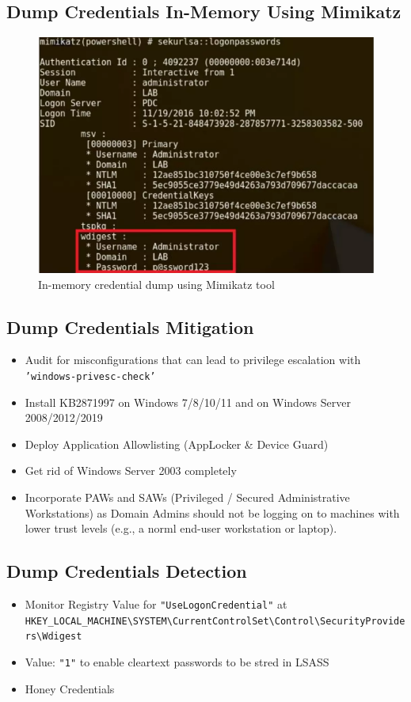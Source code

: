 \subsection{Dump Credentials In-Memory Using Mimikatz}
\begin{figure}
    \centering
    \includegraphics[width=0.75\linewidth]{mimikatz.png}
    \caption{In-memory credential dump using Mimikatz tool}
    \label{fig:placeholder}
\end{figure}
\subsection{Dump Credentials Mitigation}
\begin{itemize}
    \item Audit for misconfigurations that can lead to privilege escalation with \texttt{'windows-privesc-check'}
    \item Install KB2871997 on Windows 7/8/10/11 and on Windows Server 2008/2012/2019
    \item Deploy Application Allowlisting (AppLocker \& Device Guard)
    \item Get rid of Windows Server 2003 completely
    \item Incorporate PAWs and SAWs (Privileged / Secured Administrative Workstations) as Domain Admins should not be logging on to machines with lower trust levels (e.g., a norml end-user workstation or laptop).
\end{itemize}

\subsection{Dump Credentials Detection}
    \begin{itemize}
    \item Monitor Registry Value for \texttt{"UseLogonCredential"} at 
    \texttt{HKEY\_LOCAL\_MACHINE\textbackslash SYSTEM\textbackslash CurrentControlSet\textbackslash Control\textbackslash SecurityProviders\textbackslash Wdigest}
    \item Value: \texttt{"1"} to enable cleartext passwords to be stred in LSASS
    \item Honey Credentials
\end{itemize}

